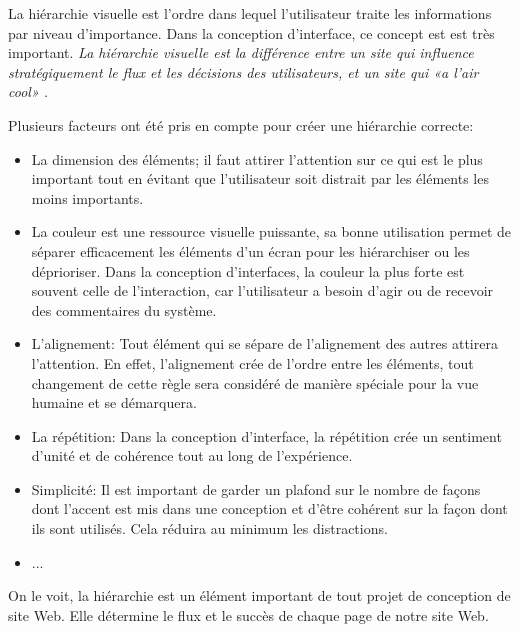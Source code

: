La hiérarchie visuelle est l'ordre dans lequel l'utilisateur traite les informations par niveau d'importance.
Dans la conception d'interface, ce concept est est très important.
\textit{La hiérarchie visuelle est la différence entre un site qui influence stratégiquement le flux et les 
décisions des utilisateurs, et un site qui «a l'air cool» \cite{cao20155}.}
\par 
Plusieurs facteurs ont été pris en compte pour créer une hiérarchie correcte:
\begin{itemize}
        \item La dimension des éléments; il faut attirer l'attention sur ce qui est le plus important
        tout en évitant que l'utilisateur soit distrait par les éléments les moins importants.
        \item La couleur est une ressource visuelle puissante, sa bonne utilisation permet de séparer 
        efficacement les éléments d'un écran pour les hiérarchiser ou les déprioriser. Dans la 
        conception d’interfaces, la couleur la plus forte est souvent celle de l’interaction, 
        car l’utilisateur a besoin d’agir ou de recevoir des commentaires du système.
        \item L'alignement: Tout élément qui se sépare de l'alignement des autres attirera l'attention. 
        En effet, l'alignement crée de l'ordre entre les éléments, tout changement de cette règle sera 
        considéré de manière spéciale pour la vue humaine et se démarquera.
        \item La répétition: Dans la conception d'interface, la répétition crée un sentiment 
        d'unité et de cohérence tout au long de l'expérience.
        \item Simplicité: Il est important de garder un plafond sur le nombre de façons dont l'accent est
         mis dans une conception et d'être cohérent sur la façon dont ils sont utilisés. 
         Cela réduira au minimum les distractions.
        \item ...\cite{design}

\end{itemize}
On le voit, la hiérarchie est un élément important de tout projet de conception de site Web. 
Elle détermine le flux et le succès de chaque page de notre site Web.


